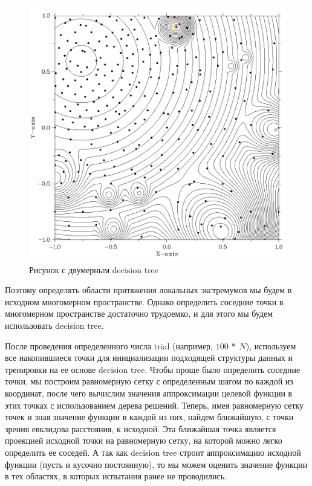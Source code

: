 \documentclass{svproc}
\begin{document}
\begin{figure}[ht!]
	\begin{center}
		\begin{minipage}[h]{0.8\linewidth}
			\includegraphics[width=1\linewidth]{figure/fig2.png}
			\caption{Рисунок с двумерным decision tree} %
			\label{fig:fig2_2}
		\end{minipage}
	\end{center}
\end{figure}	




Поэтому определять области притяжения локальных экстремумов мы будем в исходном многомерном пространстве. Однако определить соседние точки в многомерном пространстве достаточно трудоемко, и для этого мы будем использовать decision tree. 

После проведения определенного числа trial (например, $100\ \ast\ N$), используем все накопившиеся точки для инициализации подходящей структуры данных и тренировки на ее основе decision tree. Чтобы проще было определить соседние точки, мы построим равномерную сетку с определенным шагом по каждой из координат, после чего вычислим значения аппроксимации целевой функции в этих точках с использованием дерева решений. Теперь, имея равномерную сетку точек и зная значение функции в каждой из них, найдем ближайшую, с точки зрения евклидова расстояния, к исходной. Эта ближайшая точка является проекцией исходной точки на равномерную сетку, на которой можно легко определить ее соседей. А так как decision tree строит аппроксимацию исходной функции (пусть и кусочно постоянную), то мы можем оценить значение функции в тех областях, в которых испытания ранее не проводились.
\end{document}
